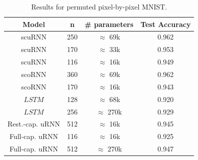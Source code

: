 \documentclass[letterpaper]{article} %
\begin{document}
\begin{table}[h]
\label{t2}
\begin{center}
\caption{Results for permuted pixel-by-pixel MNIST.}
\renewcommand{\arraystretch}{1.2}
\begin{tabular}{ | c | c | c | c |} 
\hline
\multicolumn{1}{|c|}{Model}  & 
\multicolumn{1}{|c|}{n} & 
\multicolumn{1}{|c|}{\# parameters}& 
\multicolumn{1}{|c|}{Test Accuracy} 
\\ \hline
scuRNN  
& \multicolumn{1}{|c|}{250} 
& \multicolumn{1}{|c|}{$\approx$ 69k}
& \multicolumn{1}{|c|}{0.962} 
\\\hline
scuRNN  
& \multicolumn{1}{|c|}{170} 
& \multicolumn{1}{|c|}{$\approx$ 33k}
& \multicolumn{1}{|c|}{0.953} 
\\\hline
scuRNN  
& \multicolumn{1}{|c|}{116} 
& \multicolumn{1}{|c|}{$\approx$ 16k}
& \multicolumn{1}{|c|}{0.949} 
\\\hline
scoRNN 
& \multicolumn{1}{|c|}{360} 
& \multicolumn{1}{|c|}{$\approx$ 69k}
& \multicolumn{1}{|c|}{0.962} 
\\\hline
scoRNN 
& \multicolumn{1}{|c|}{170} 
& \multicolumn{1}{|c|}{$\approx$ 16k}
& \multicolumn{1}{|c|}{0.943} 
\\\hline
$LSTM$  
& \multicolumn{1}{|c|}{128} 
& \multicolumn{1}{|c|}{$\approx$ 68k}
& \multicolumn{1}{|c|}{0.920} 
\\\hline
$LSTM$  
& \multicolumn{1}{|c|}{256} 
& \multicolumn{1}{|c|}{$\approx$ 270k}
& \multicolumn{1}{|c|}{0.929} 
\\\hline
Rest.-cap. uRNN  
& \multicolumn{1}{|c|}{512} 
& \multicolumn{1}{|c|}{$\approx$ 16k}
& \multicolumn{1}{|c|}{0.945} 
\\\hline
Full-cap. uRNN  
& \multicolumn{1}{|c|}{116} 
& \multicolumn{1}{|c|}{$\approx$ 16k}
& \multicolumn{1}{|c|}{0.925} 
\\\hline
Full-cap. uRNN  
& \multicolumn{1}{|c|}{512} 
& \multicolumn{1}{|c|}{$\approx$ 270k}
& \multicolumn{1}{|c|}{0.947} 
\\\hline
\end{tabular}
\end{center}
\end{table}
\end{document}
